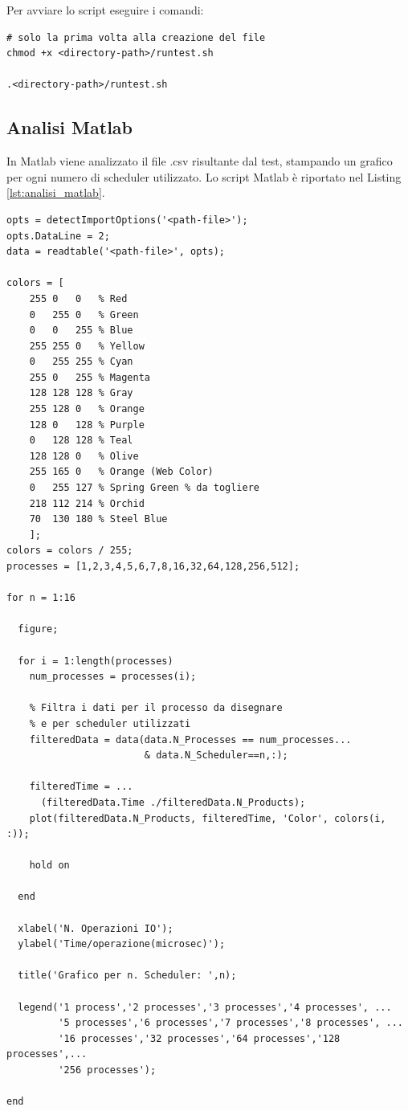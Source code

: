 Per avviare lo script eseguire i comandi:
\begin{lstlisting}[language=none]
# solo la prima volta alla creazione del file
chmod +x <directory-path>/runtest.sh 

.<directory-path>/runtest.sh
\end{lstlisting}


\subsection{Analisi Matlab}

In Matlab viene analizzato il file .csv risultante dal
test, stampando un grafico per ogni numero di scheduler utilizzato.
Lo script Matlab è riportato nel Listing \ref{lst:analisi_matlab}.

\begin{lstlisting}[language=none,captionpos=b,
	caption={Analisi dei processi in Matlab},label={lst:analisi_matlab}]
opts = detectImportOptions('<path-file>');
opts.DataLine = 2;
data = readtable('<path-file>', opts);
	
colors = [
	255 0   0   % Red
	0   255 0   % Green
	0   0   255 % Blue
	255 255 0   % Yellow
	0   255 255 % Cyan
	255 0   255 % Magenta
	128 128 128 % Gray
	255 128 0   % Orange
	128 0   128 % Purple
	0   128 128 % Teal
	128 128 0   % Olive
	255 165 0   % Orange (Web Color)
	0   255 127 % Spring Green % da togliere
	218 112 214 % Orchid
	70  130 180 % Steel Blue
	];
colors = colors / 255;
processes = [1,2,3,4,5,6,7,8,16,32,64,128,256,512];
	
for n = 1:16
	
  figure;
	
  for i = 1:length(processes)
    num_processes = processes(i);

    % Filtra i dati per il processo da disegnare 
    % e per scheduler utilizzati
    filteredData = data(data.N_Processes == num_processes... 
                        & data.N_Scheduler==n,:);

    filteredTime = ...
      (filteredData.Time ./filteredData.N_Products);
    plot(filteredData.N_Products, filteredTime, 'Color', colors(i, :));

    hold on

  end
	
  xlabel('N. Operazioni IO');
  ylabel('Time/operazione(microsec)');

  title('Grafico per n. Scheduler: ',n);

  legend('1 process','2 processes','3 processes','4 processes', ...
         '5 processes','6 processes','7 processes','8 processes', ...
         '16 processes','32 processes','64 processes','128 processes',...
         '256 processes');

end
\end{lstlisting}

